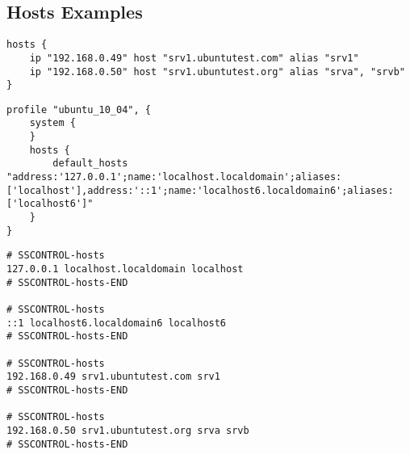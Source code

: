 \subsection{Hosts Examples}

\begin{lstlisting}[style=Sscontrol,
label={lst:hosts_example_script},
title={Adds IP addresses and the host name.}]
hosts {
    ip "192.168.0.49" host "srv1.ubuntutest.com" alias "srv1"
    ip "192.168.0.50" host "srv1.ubuntutest.org" alias "srva", "srvb"
}
\end{lstlisting}

\begin{lstlisting}[style=Sscontrol,
label={lst:hosts_ubuntu_profile},
title={Sets default list of hosts.}]
profile "ubuntu_10_04", {
    system {
    }
    hosts {
        default_hosts "address:'127.0.0.1';name:'localhost.localdomain';aliases:['localhost'],address:'::1';name:'localhost6.localdomain6';aliases:['localhost6']"
    }
}
\end{lstlisting}

\begin{lstlisting}[style=Bash,
label={lst:hosts_example},
title={Example hosts configuration file.}]
# SSCONTROL-hosts
127.0.0.1 localhost.localdomain localhost
# SSCONTROL-hosts-END

# SSCONTROL-hosts
::1 localhost6.localdomain6 localhost6
# SSCONTROL-hosts-END

# SSCONTROL-hosts
192.168.0.49 srv1.ubuntutest.com srv1
# SSCONTROL-hosts-END

# SSCONTROL-hosts
192.168.0.50 srv1.ubuntutest.org srva srvb
# SSCONTROL-hosts-END
\end{lstlisting}


